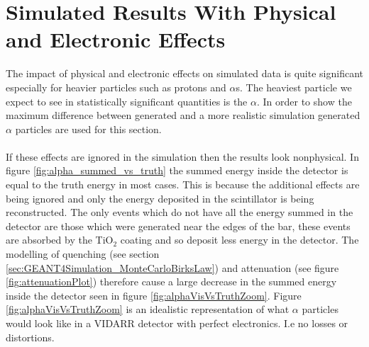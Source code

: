 \section{Simulated Results With Physical and Electronic Effects}\label{sec:GEANT4Simulation_resultsPhysicalElectronics}
The impact of physical and electronic effects on simulated data is quite significant especially for heavier particles such as protons and $\alpha$s. The heaviest particle we expect to see in statistically significant quantities is the $\alpha$. In order to show the maximum difference between generated and a more realistic simulation generated $\alpha$ particles are used for this section. 
\\\\If these effects are ignored in the simulation then the results look nonphysical. In figure \ref{fig:alpha_summed_vs_truth} the summed energy inside the detector is equal to the truth energy in most cases. This is because the additional effects are being ignored and only the energy deposited in the scintillator is being reconstructed. The only events which do not have all the energy summed in the detector are those which were generated near the edges of the bar, these events are absorbed by the TiO$_2$ coating and so deposit less energy in the detector. The modelling of quenching (see section \ref{sec:GEANT4Simulation_MonteCarloBirksLaw}) and attenuation (see figure \ref{fig:attenuationPlot}) therefore cause a large decrease in the summed energy inside the detector seen in figure \ref{fig:alphaVisVsTruthZoom}. Figure \ref{fig:alphaVisVsTruthZoom} is an idealistic representation of what $\alpha$ particles would look like in a VIDARR detector with perfect electronics. I.e no losses or distortions.

